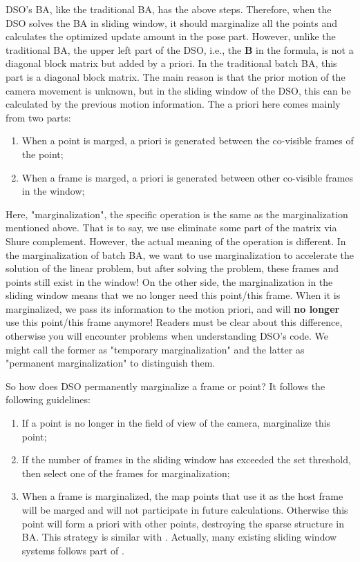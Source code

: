 \documentclass[a4paper,10pt]{article}
\begin{document}
	DSO's BA, like the traditional BA, has the above steps. Therefore, when the DSO solves the BA in sliding window, it should marginalize all the points and calculates the optimized update amount in the pose part. However, unlike the traditional BA, the upper left part of the DSO, i.e., the $\mathbf{B}$ in the formula, is not a diagonal block matrix but added by a priori. In the traditional batch BA, this part is a diagonal block matrix. The main reason is that the prior motion of the camera movement is unknown, but in the sliding window of the DSO, this can be calculated by the previous motion information. The a priori here comes mainly from two parts:
	\begin{enumerate}
	\item When a point is marged, a priori is generated between the co-visible frames of the point;
	\item When a frame is marged, a priori is generated between other co-visible frames in the window;
	\end{enumerate}
	
	Here, "marginalization", the specific operation is the same as the marginalization mentioned above. That is to say, we use eliminate some part of the matrix via Shure complement. However, the actual meaning of the operation is different. In the marginalization of batch BA, we want to use marginalization to accelerate the solution of the linear problem, but after solving the problem, these frames and points still exist in the window! On the other side, the marginalization in the sliding window means that we no longer need this point/this frame. When it is marginalized, we pass its information to the motion priori, and will \textbf{no longer} use this point/this frame anymore! Readers must be clear about this difference, otherwise you will encounter problems when understanding DSO's code. We might call the former as "temporary marginalization" and the latter as "permanent marginalization" to distinguish them.
	
	So how does DSO permanently marginalize a frame or point? It follows the following guidelines:
	\begin{enumerate}
	\item If a point is no longer in the field of view of the camera, marginalize this point;
	\item If the number of frames in the sliding window has exceeded the set threshold, then select one of the frames for marginalization;
	\item When a frame is marginalized, the map points that use it as the host frame will be marged and will not participate in future calculations. Otherwise this point will form a priori with other points, destroying the sparse structure in BA. This strategy is similar with \cite{leutenegger2015keyframe}. Actually, many existing sliding window systems follows part of \cite{leutenegger2015keyframe}.
	\end{enumerate}
	
\end{document}
